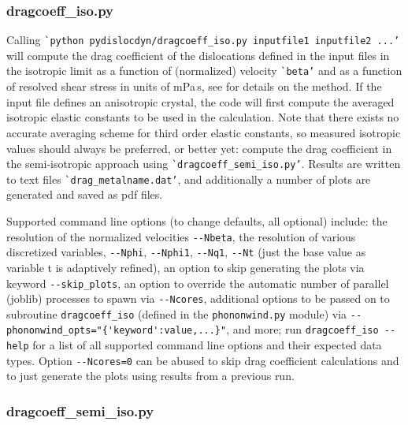\documentclass[11pt,letterpaper,oneside,pdftex]{article}
\begin{document}
\subsubsection{dragcoeff\_iso.py}

Calling \verb|`python pydislocdyn/dragcoeff_iso.py inputfile1 inputfile2 ...’| will compute the drag coefficient of the dislocations defined in the input files in the isotropic limit as a function of (normalized) velocity \verb|`beta’| and as a function of resolved shear stress in units of mPa\,s, see \cite{Blaschke:BpaperRpt,Blaschke:2019Bpap,Blaschke:2019a} for details on the method.
If the input file defines an anisotropic crystal, the code will first compute the averaged isotropic elastic constants to be used in the calculation.
Note that there exists no accurate averaging scheme for third order elastic constants, so measured isotropic values should always be preferred, or better yet: compute the drag coefficient in the semi-isotropic approach using  \verb|`dragcoeff_semi_iso.py’|.
Results are written to text files \verb|`drag_metalname.dat’|, and additionally a number of plots are generated and saved as pdf files.

Supported command line options (to change defaults, all optional) include:
the resolution of the normalized velocities \verb|--Nbeta|,
the resolution of various discretized variables, \verb|--Nphi|, \verb|--Nphi1|, \verb|--Nq1|, \verb|--Nt| (just the base value as variable t is adaptively refined),
an option to skip generating the plots via keyword \verb|--skip_plots|,
an option to override the automatic number of parallel (joblib) processes to spawn via \verb|--Ncores|,
additional options to be passed on to subroutine \verb|dragcoeff_iso| (defined in the \verb|phononwind.py| module) via \verb|--phononwind_opts="{'keyword':value,...}"|,
and more; run \verb|dragcoeff_iso --help| for a list of all supported command line options and their expected data types.
Option \verb|--Ncores=0| can be abused to skip drag coefficient calculations and to just generate the plots using results from a previous run.



\subsubsection{dragcoeff\_semi\_iso.py}
\end{document}
